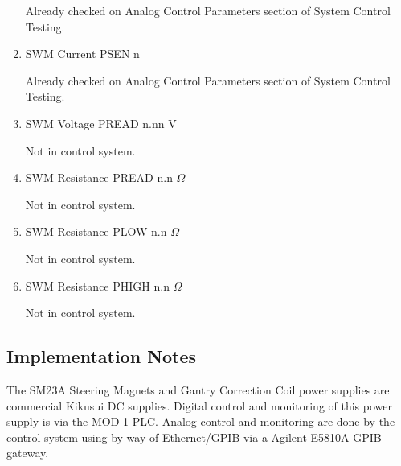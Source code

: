 \documentclass[11pt]{book}		%
\begin{document}
\begin{enumerate}
\color{red}
Already checked on Analog Control Parameters section of System Control Testing.
\color{black}

 \item SWM Current PSEN  n

\color{red}
Already checked on Analog Control Parameters section of System Control Testing.
\color{black}

 \item SWM Voltage PREAD n.nn V

\color{red}
Not in control system.
\color{black}

 \item SWM Resistance PREAD n.n $\Omega$

\color{red}
Not in control system.
\color{black}

 \item SWM Resistance PLOW n.n $\Omega$

\color{red}
Not in control system.
\color{black}

 \item SWM Resistance PHIGH n.n $\Omega$

\color{red}
Not in control system.
\color{black}

\end{enumerate}

\subsection{Implementation Notes}

The SM23A Steering Magnets and Gantry Correction Coil power supplies are commercial Kikusui DC supplies.  Digital control and monitoring of this power supply is via the MOD 1 PLC.  Analog control and monitoring are done by the control system using by way of Ethernet/GPIB via a Agilent E5810A GPIB gateway.
\end{document}
